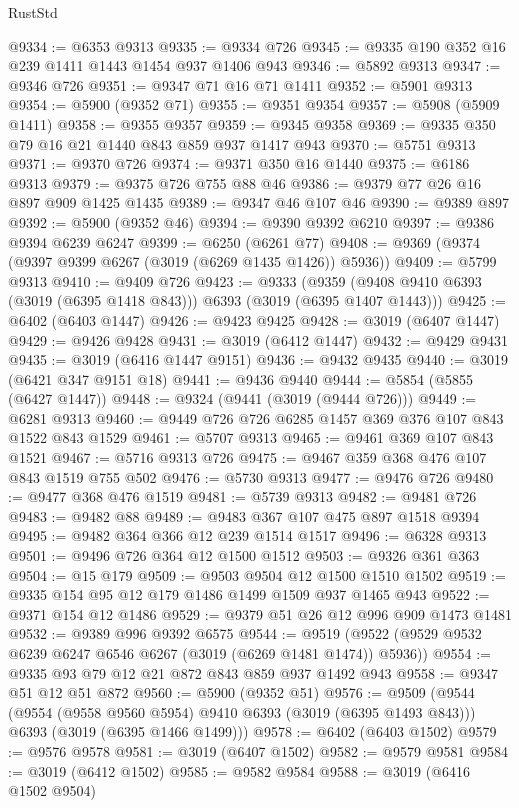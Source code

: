 \begin{lexlean}{RustStd}
\begin{coremodule}
@9334 := @6353 @9313
@9335 := @9334 @726
@9345 := @9335 @190 @352 @16 @239 @1411 @1443 @1454 @937 @1406 @943
@9346 := @5892 @9313
@9347 := @9346 @726
@9351 := @9347 @71 @16 @71 @1411
@9352 := @5901 @9313
@9354 := @5900 (@9352 @71)
@9355 := @9351 @9354
@9357 := @5908 (@5909 @1411)
@9358 := @9355 @9357
@9359 := @9345 @9358
@9369 := @9335 @350 @79 @16 @21 @1440 @843 @859 @937 @1417 @943
@9370 := @5751 @9313
@9371 := @9370 @726
@9374 := @9371 @350 @16 @1440
@9375 := @6186 @9313
@9379 := @9375 @726 @755 @88 @46
@9386 := @9379 @77 @26 @16 @897 @909 @1425 @1435
@9389 := @9347 @46 @107 @46
@9390 := @9389 @897
@9392 := @5900 (@9352 @46)
@9394 := @9390 @9392 @6210
@9397 := @9386 @9394 @6239 @6247
@9399 := @6250 (@6261 @77)
@9408 := @9369 (@9374 (@9397 @9399 @6267 (@3019 (@6269 @1435 @1426)) @5936))
@9409 := @5799 @9313
@9410 := @9409 @726
@9423 := @9333
    (@9359 (@9408 @9410 @6393 (@3019 (@6395 @1418 @843))) @6393 (@3019 (@6395 @1407 @1443)))
@9425 := @6402 (@6403 @1447)
@9426 := @9423 @9425
@9428 := @3019 (@6407 @1447)
@9429 := @9426 @9428
@9431 := @3019 (@6412 @1447)
@9432 := @9429 @9431
@9435 := @3019 (@6416 @1447 @9151)
@9436 := @9432 @9435
@9440 := @3019 (@6421 @347 @9151 @18)
@9441 := @9436 @9440
@9444 := @5854 (@5855 (@6427 @1447))
@9448 := @9324 (@9441 (@3019 (@9444 @726)))
@9449 := @6281 @9313
@9460 := @9449 @726 @726 @6285 @1457 @369 @376 @107 @843 @1522 @843 @1529
@9461 := @5707 @9313
@9465 := @9461 @369 @107 @843 @1521
@9467 := @5716 @9313 @726
@9475 := @9467 @359 @368 @476 @107 @843 @1519 @755 @502
@9476 := @5730 @9313
@9477 := @9476 @726
@9480 := @9477 @368 @476 @1519
@9481 := @5739 @9313
@9482 := @9481 @726
@9483 := @9482 @88
@9489 := @9483 @367 @107 @475 @897 @1518 @9394
@9495 := @9482 @364 @366 @12 @239 @1514 @1517
@9496 := @6328 @9313
@9501 := @9496 @726 @364 @12 @1500 @1512
@9503 := @9326 @361 @363
@9504 := @15 @179
@9509 := @9503 @9504 @12 @1500 @1510 @1502
@9519 := @9335 @154 @95 @12 @179 @1486 @1499 @1509 @937 @1465 @943
@9522 := @9371 @154 @12 @1486
@9529 := @9379 @51 @26 @12 @996 @909 @1473 @1481
@9532 := @9389 @996 @9392 @6575
@9544 := @9519 (@9522 (@9529 @9532 @6239 @6247 @6546 @6267 (@3019 (@6269 @1481 @1474)) @5936))
@9554 := @9335 @93 @79 @12 @21 @872 @843 @859 @937 @1492 @943
@9558 := @9347 @51 @12 @51 @872
@9560 := @5900 (@9352 @51)
@9576 := @9509
    (@9544
      (@9554 (@9558 @9560 @5954) @9410 @6393 (@3019 (@6395 @1493 @843)))
      @6393
      (@3019 (@6395 @1466 @1499)))
@9578 := @6402 (@6403 @1502)
@9579 := @9576 @9578
@9581 := @3019 (@6407 @1502)
@9582 := @9579 @9581
@9584 := @3019 (@6412 @1502)
@9585 := @9582 @9584
@9588 := @3019 (@6416 @1502 @9504)

\end{coremodule}
\end{lexlean}
